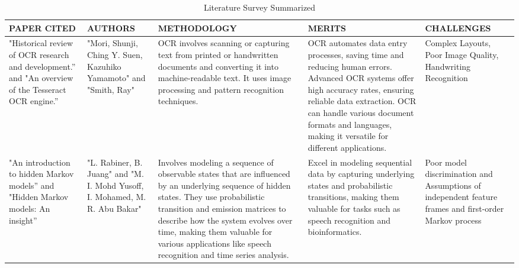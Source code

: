 \documentclass[fleqn,10pt]{thescipub} %
\begin{document}
\baselineskip
\begin{table}
 \caption{Literature Survey Summarized}
\begin{center}
 \centering
  \small %
    \begin{tabular}{ |p{2cm}|p{2cm}|p{3.75cm}|p{3.75cm}|p{3.5cm}| }
\hline
\centering PAPER CITED & \centering  AUTHORS & \centering METHODOLOGY &  \centering MERITS &  \centering CHALLENGES \arraybackslash \\ 
\hline
"Historical review of OCR research and development.” and "An overview of the Tesseract OCR engine.”  &  "Mori, Shunji, Ching Y. Suen, Kazuhiko Yamamoto" and "Smith, Ray" &  OCR involves scanning or capturing text from printed or handwritten documents and converting it into machine-readable text. It uses image processing and pattern recognition techniques. &  OCR automates data entry processes, saving time and reducing human errors. Advanced OCR systems offer high accuracy rates, ensuring reliable data extraction. OCR can handle various document formats and languages, making it versatile for different applications. &  Complex Layouts, Poor Image Quality, Handwriting Recognition  \\
\hline
"An introduction to hidden Markov models” and "Hidden Markov models: An insight” &  "L. Rabiner, B. Juang" and "M. I. Mohd Yusoff, I. Mohamed, M. R. Abu Bakar" &  Involves modeling a sequence of observable states that are influenced by an underlying sequence of hidden states. They use probabilistic transition and emission matrices to describe how the system evolves over time, making them valuable for various applications like speech recognition and time series analysis. & Excel in modeling sequential data by capturing underlying states and probabilistic transitions, making them valuable for tasks such as speech recognition and bioinformatics. &  Poor model discrimination and Assumptions of independent feature frames and first-order Markov process  \\

\end{tabular}
\end{center}
\end{table}
\end{document}
